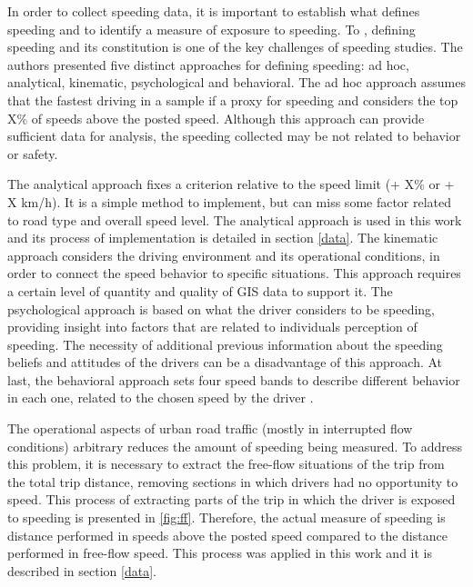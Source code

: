 



In order to collect speeding data, it is important to establish what defines speeding and to identify a measure of exposure to speeding. To \textcite{Richard2013}, defining speeding and its constitution is one of the key challenges of speeding studies. The authors presented five distinct approaches for defining speeding: ad hoc, analytical, kinematic, psychological and behavioral. The ad hoc approach assumes that the fastest driving in a sample if a proxy for speeding and considers the top X\% of speeds above the posted speed. Although this approach can provide sufficient data for analysis, the speeding collected may be not related to behavior or safety. 

The analytical approach fixes a criterion relative to the speed limit (+ X\% or + X km/h). It is a simple method to implement, but can miss some factor related to road type and overall speed level. The analytical approach is used in this work and its process of implementation is detailed in section \ref{data}. The kinematic approach considers the driving environment and its operational conditions, in order to connect the speed behavior to specific situations. This approach requires a certain level of quantity and quality of GIS data to support it. The psychological approach is based on what the driver considers to be speeding, providing insight into factors that are related to individuals perception of speeding. The necessity of additional previous information about the speeding beliefs and attitudes of the drivers can be a disadvantage of this approach. At last, the behavioral approach sets four speed bands to describe different behavior in each one, related to the chosen speed by the driver \cite{Richard2013}.

The operational aspects of urban road traffic (mostly in interrupted flow conditions) arbitrary reduces the amount of speeding being measured. To address this problem, it is necessary to extract the free-flow situations of the trip from the total trip distance, removing sections in which drivers had no opportunity to speed. This process of extracting parts of the trip in which the driver is exposed to speeding is presented in \autoref{fig:ff}. Therefore, the actual measure of speeding is distance performed in speeds above the posted speed compared to the distance performed in free-flow speed. This process was applied in this work and it is described in section \ref{data}. 

